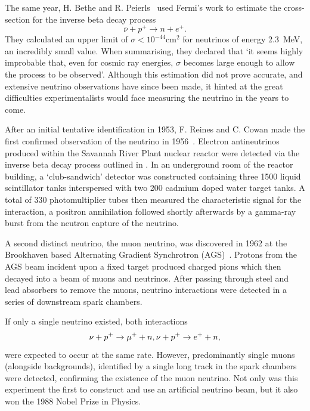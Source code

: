 The same year, H. Bethe and R. Peierls~\cite{bethe1934} used Fermi's work to estimate the
cross-section for the inverse beta decay process
\begin{equation} %
    \bar{\nu} + p^{+} \rightarrow n + e^{+}.
    \label{eq:inverse_beta_decay}
\end{equation}
They calculated an upper limit of $\sigma<10^{-44} \text{cm}^2$ for neutrinos of energy
\SI{2.3}{\MeV}, an incredibly small value. When summarising, they declared that `it seems highly
improbable that, even for cosmic ray energies, $\sigma$ becomes large enough to allow the process
to be observed'. Although this estimation did not prove accurate, and extensive neutrino
observations have since been made, it hinted at the great difficulties experimentalists would face
measuring the neutrino in the years to come.

After an initial tentative identification in 1953, F. Reines and C. Cowan made the first confirmed
observation of the neutrino in 1956~\cite{cowan1956}. Electron antineutrinos produced within the
Savannah River Plant nuclear reactor were detected via the inverse beta decay process outlined in
. In an underground room of the reactor building, a
`club-sandwich' detector was constructed containing three \SI{1500}{} liquid
scintillator tanks interspersed with two \SI{200}{} cadmium doped water target tanks.
A total of 330 photomultiplier tubes then measured the characteristic signal for the interaction,
a positron annihilation followed shortly afterwards by a gamma-ray burst from the neutron capture
of the neutrino.

A second distinct neutrino, the muon neutrino, was discovered in 1962 at the Brookhaven based
Alternating Gradient Synchrotron (AGS)~\cite{danby1962}. Protons from the AGS beam incident upon a
fixed target produced charged pions which then decayed into a beam of muons and neutrinos. After
passing through steel and lead absorbers to remove the muons, neutrino interactions were detected
in a series of downstream spark chambers.

If only a single neutrino existed, both interactions
\begin{equation} %
    \nu+p^{+}\rightarrow\mu^{+}+n, \\
    \nu+p^{+}\rightarrow e^{+}+n,
\end{equation}
were expected to occur at the same rate. However, predominantly single muons (alongside
backgrounds), identified by a single long track in the spark chambers were detected, confirming
the existence of the muon neutrino. Not only was this experiment the first to construct and use an
artificial neutrino beam, but it also won the 1988 Nobel Prize in Physics.

